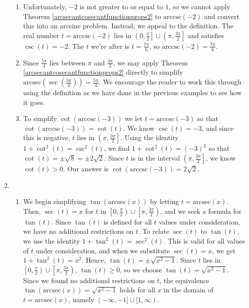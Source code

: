 \begin{ex}
\begin{enumerate}
\begin{enumerate}
\item  Unfortunately, $-2$ is not greater to or equal to $1$, so we cannot apply Theorem \ref{arcsecantcosecantfunctionprops2} to  $\mbox{arccsc}(-2)$ and convert this into an arcsine problem.  Instead, we appeal to the definition.  The real number $t = \mbox{arccsc}(-2)$ lies in $\left(0,\frac{\pi}{2} \right] \cup \left(\pi, \frac{3\pi}{2}\right]$ and satisfies $\csc(t) = -2$.  The $t$ we're after is $t = \frac{7\pi}{6}$, so $\mbox{arccsc}(-2) = \frac{7\pi}{6}$.

\item  Since $\frac{5\pi}{4}$ lies between $\pi$ and $\frac{3\pi}{2}$, we may apply Theorem \ref{arcsecantcosecantfunctionprops2} directly to simplify $\mbox{arcsec}\left( \sec\left( \frac{5\pi}{4} \right) \right) = \frac{5\pi}{4}$.  We encourage the reader to work this through using the definition as we have done in the  previous examples to see how it goes.

\item  To simplify $\cot\left(\mbox{arccsc}\left(-3\right)\right)$ we let $t = \mbox{arccsc}\left(-3\right)$ so that  $\cot\left(\mbox{arccsc}\left(-3\right)\right) = \cot(t)$.  We know $\csc(t) = -3$, and since this is negative,  $t$ lies in $\left( \pi, \frac{3\pi}{2}\right]$.  Using the identity $1 + \cot^{2}(t) = \csc^{2}(t)$, we find $1 + \cot^{2}(t) = (-3)^2$ so that $\cot(t) = \pm \sqrt{8} = \pm 2 \sqrt{2}$.  Since $t$ is in the interval $\left(\pi, \frac{3\pi}{2}\right]$, we know $\cot(t) > 0$.  Our answer is $\cot\left(\mbox{arccsc}\left(-3\right)\right) = 2 \sqrt{2}$.

\end{enumerate}

\item 
\begin{enumerate}

\item  We begin simplifying  $\tan(\mbox{arcsec}(x))$ by letting $t = \mbox{arcsec}(x)$.  Then, $\sec(t) = x$ for $t$ in $\left[0, \frac{\pi}{2} \right) \cup \left[\pi, \frac{3\pi}{2} \right)$, and we seek a formula for $\tan(t)$.  Since $\tan(t)$ is defined for all $t$ values under consideration, we have no additional restrictions on $t$.  To relate $\sec(t)$ to $\tan(t)$, we use the identity $1 + \tan^{2}(t) = \sec^{2}(t)$.  This is valid for all values of $t$ under consideration, and when we substitute $\sec(t) = x$, we get $1 + \tan^{2}(t) = x^2$.  Hence, $\tan(t) = \pm \sqrt{x^2-1}$. Since $t$ lies in $\left[0, \frac{\pi}{2} \right) \cup \left[\pi, \frac{3\pi}{2} \right)$, $\tan(t) \geq 0$, so we choose $\tan(t) = \sqrt{x^2-1}$.  Since we found no additional restrictions on $t$, the equivalence $\tan(\mbox{arcsec}(x)) = \sqrt{x^2-1}$ holds for all $x$ in the domain of $t = \mbox{arcsec}(x)$, namely $(-\infty, -1] \cup [1,\infty)$.


\end{enumerate}
\end{enumerate}
\end{ex}
